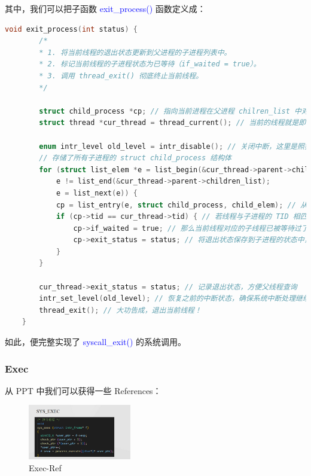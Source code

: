 \documentclass[14pt,a4paper,UTF8,twoside]{article}
\renewcommand{\texttt}[1]{\textcolor{blue}{\ttfamily #1}}
\begin{document}
其中，我们可以把子函数 \texttt{exit\_process()} 函数定义成：

\begin{lstlisting}[language=C, title= exit\_process()]
    void exit_process(int status) {
        /*
        * 1. 将当前线程的退出状态更新到父进程的子进程列表中。
        * 2. 标记当前线程的子进程状态为已等待（if_waited = true）。
        * 3. 调用 thread_exit() 彻底终止当前线程。
        */

        struct child_process *cp; // 指向当前进程在父进程 chilren_list 中对应子进程的状态
        struct thread *cur_thread = thread_current(); // 当前的线程就是即将调用 Exit() 系统调用的进程
    
        enum intr_level old_level = intr_disable(); // 关闭中断，这里是照猫画虎
        // 存储了所有子进程的 struct child_process 结构体
        for (struct list_elem *e = list_begin(&cur_thread->parent->children_list);
            e != list_end(&cur_thread->parent->children_list);
            e = list_next(e)) {
            cp = list_entry(e, struct child_process, child_elem); // 从链表元素 e 获取结构体
            if (cp->tid == cur_thread->tid) { // 若线程与子进程的 TID 相匹配
                cp->if_waited = true; // 那么当前线程对应的子线程已被等待过了，可以防止父进程重复调用 wait()
                cp->exit_status = status; // 将退出状态保存到子进程的状态中，父进程就可以通过 exit() 获取
            }
        }

        cur_thread->exit_status = status; // 记录退出状态，方便父线程查询
        intr_set_level(old_level); // 恢复之前的中断状态，确保系统中断处理继续正常运行
        thread_exit(); // 大功告成，退出当前线程！
    }
\end{lstlisting}

如此，便完整实现了 \texttt{syscall\_exit()} 的系统调用。

\subsubsection{Exec}

从 PPT 中我们可以获得一些 References：

\begin{figure}[H]
    \centering
    \includegraphics[width=0.4\textwidth]{img6/ref-exec.png}
    \caption{Exec-Ref}
    \label{fig:exec}
\end{figure}
\end{document}
